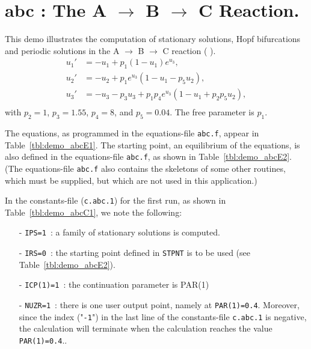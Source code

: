 \documentclass[12pt]{report}
\begin{document}
\newpage
\section{ abc : The A $\to$ B $\to$ C Reaction.} \label{sec:Demos_abc}
This demo illustrates the computation of 
stationary solutions,
Hopf bifurcations 
and
periodic solutions
in the A $\to$ B $\to$ C reaction 
( \citeyear{DoHe:83}).
\begin{equation} \begin{array}{cl}
  u_1 ' &=  -u_1 + p_1 (1-u_1) e^{u_3}, \\
  u_2 ' &=  -u_2 +  p_1 e^{u_3} ( 1-u_1 - p_5 u_2 ),\\
  u_3 ' &=  -u_3 - p_3 u_3 + p_1 p_4 e^{u_3}  
  ( 1-u_1 + p_2 p_5 u_2 ),\\ \end{array} \end{equation}
with $p_2=1$, $p_3=1.55$, $p_4=8$, and $p_5=0.04$. 
The free parameter is $p_1$.

The equations, as programmed in the equations-file {\tt abc.f},
appear in Table~\ref{tbl:demo_abcE1}.
The starting point, an equilibrium of the equations,
is also defined in  the equations-file {\tt abc.f},
as shown in  Table~\ref{tbl:demo_abcE2}.
(The equations-file {\tt abc.f} also contains the skeletons
of some other routines, which must be supplied, but which 
are not used in this application.)

In the constants-file ({\tt c.abc.1}) for the first run, as shown in 
Table~\ref{tbl:demo_abcC1}, we note the following:

\begin{itemize}
\item[-] {\tt IPS=1}~: a family of stationary solutions is computed.

\item[-] {\tt IRS=0}~: the starting point defined in {\tt STPNT} 
	 is to be used (see  Table~\ref{tbl:demo_abcE2}). 

\item[-] {\tt ICP(1)=1}~: the continuation parameter is PAR(1) 

\item[-] {\tt NUZR=1}~: there is one user output point, namely at
	 {\tt PAR(1)=0.4}. Moreover, since the index ("{\tt -1}") in
	 the last line of the constants-file {\tt c.abc.1} is negative, 
	 the calculation will terminate when the calculation reaches
	 the value {\tt PAR(1)=0.4}..
\end{itemize}
\end{document}
